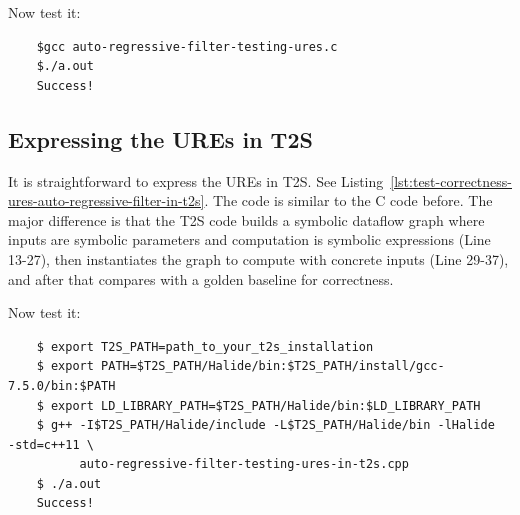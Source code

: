 


Now test it: 
\begin{verbatim}
    $gcc auto-regressive-filter-testing-ures.c
    $./a.out
    Success!
\end{verbatim}

\subsection{Expressing the UREs in T2S}
\label{sec:express-ures-in-t2s}

It is straightforward to express the UREs in T2S. See Listing~\ref{lst:test-correctness-ures-auto-regressive-filter-in-t2s}. The code is similar to the C code before. The major difference is that the T2S code builds a symbolic dataflow graph where inputs are symbolic parameters and computation is symbolic expressions (Line 13-27), then instantiates the graph to compute with concrete inputs (Line 29-37), and after that compares with a golden baseline for correctness.  



Now test it: 
\begin{verbatim}
    $ export T2S_PATH=path_to_your_t2s_installation
    $ export PATH=$T2S_PATH/Halide/bin:$T2S_PATH/install/gcc-7.5.0/bin:$PATH
    $ export LD_LIBRARY_PATH=$T2S_PATH/Halide/bin:$LD_LIBRARY_PATH
    $ g++ -I$T2S_PATH/Halide/include -L$T2S_PATH/Halide/bin -lHalide  -std=c++11 \   
          auto-regressive-filter-testing-ures-in-t2s.cpp
    $ ./a.out 
    Success!
\end{verbatim}


